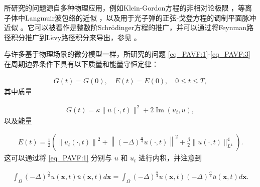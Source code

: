 所研究的问题源自多种物理应用，例如Klein-Gordon方程的非相对论极限 \cite{tsutsumiNonrelativisticApproximationNonlinear1984,machiharaNonrelativisticLimitEnergy2002}，等离子体中Langmuir波包络的近似 \cite{colinSemidiscretizationTimeNonlinear1998}，以及用于光子弹的正弦-戈登方程的调制平面脉冲近似 \cite{baoComparisonsSineGordonPerturbed2010,xinModelingLightBullets2000}。它可以被看作是整数阶Schr{\"o}dinger方程的推广，并可以通过将Feynman路径积分推广到L$\acute{e}$vy路径积分来导出，参见 \cite{laskinFractionalQuantumMechanics2000,laskinFractionalSchrodingerEquation2002}。

与许多基于物理场景的微分模型一样，所研究的问题 \eqref{eq_PAVF:1}-\eqref{eq_PAVF:3} 在周期边界条件下具有以下质量和能量守恒定律：

\begin{align}\label{eq_PAVF:7}
G(t)=G(0), \quad E(t)=E(0), \quad 0 \leq t \leq T,
\end{align}
其中质量

\begin{align}\label{eq_PAVF:8}
G(t)=\kappa\|u(\cdot, t)\|^{2}+2\operatorname{Im}\left(u_{t}, u\right),
\end{align}
以及能量

\begin{align}\label{eq_PAVF:9}
E(t)=\frac{1}{2}\left(\left\|u_{t}(\cdot, t)\right\|^{2}+\left\|(-\Delta)^{\frac{\alpha}{4}} u(\cdot, t)\right\|^{2}+\frac{\beta}{2}\|u(\cdot, t)\|_{L^{4}}^{4}\right).
\end{align}
这可以通过将 \eqref{eq_PAVF:1} 分别与 $u$ 和 $u_{t}$ 进行内积，并注意到

\begin{align} \label{eq_PAVF:11223}
 	\int_{\Omega}(-\Delta)^{\frac{\alpha}{2}} u(\boldsymbol{x}, t) \bar{u}(\boldsymbol{x}, t) d \boldsymbol{x}=\int_{\Omega}(-\Delta)^{\frac{\alpha}{4}} u(\boldsymbol{x}, t)(-\Delta)^{\frac{\alpha}{4}} \bar{u}(\boldsymbol{x}, t) d \boldsymbol{x}.
 \end{align}


